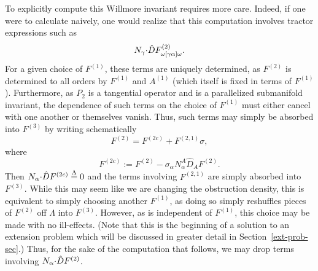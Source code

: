 \documentclass[pdftex]{sigma}
\numberwithin{equation}{section}
\newcommand{\hd }{\hat{D}}
\renewcommand{\=}{\stackrel \Lambda =}
\newcommand{\csdot}{\hspace{-0.75mm} \cdot \hspace{-0.75mm}}
\begin{document}
To explicitly compute this Willmore invariant requires more care. Indeed, if one were to calculate naively, one would realize that this computation involves tractor expressions such as
\[N_{\gamma} \csdot \hd F^{(2)}_{\omega [\gamma \alpha] \omega} .\]
For a given choice of $F^{(1)}$, these terms are uniquely determined, as $F^{(2)}$ is determined to all orders by $F^{(1)}$ and $A^{(1)}$ \big(which itself is fixed in terms of $F^{(1)}$\big). Furthermore, as $P_2$ is a tangential operator and  is a parallelized submanifold invariant, the dependence of such terms on the choice of $F^{(1)}$ must either cancel with one another or themselves vanish. Thus, such terms may simply be absorbed into $F^{(3)}$ by writing schematically
\[F^{(2)} = F^{(2c)} + F^{(2,1)} \sigma ,\]
where
\[F^{(2c)} := F^{(2)} - \sigma_{\alpha} N^A_{\alpha} \hd_A F^{(2)} .\]
Then $N_{\alpha} \csdot \hd F^{(2c)} \= 0$ and the terms involving $F^{(2,1)}$ are simply absorbed into $F^{(3)}$. While this may seem like we are changing the obstruction density, this is equivalent to simply choosing another $F^{(1)}$, as doing so simply reshuffles pieces of $F^{(2)}$ off $\Lambda$ into $F^{(3)}$. However, as  is independent of $F^{(1)}$, this choice may be made with no ill-effects. (Note that this is the beginning of a solution to an extension problem which will be discussed in greater detail in Section~\ref{ext-prob-sec}.) Thus, for the sake of the computation that follows, we may drop terms involving $N_{\alpha} \csdot \hd F^{(2)}$.
\end{document}
